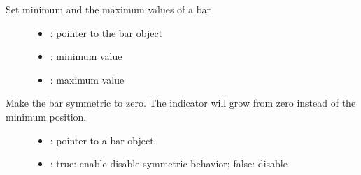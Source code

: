 \documentclass[letterpaper,10pt,english]{sphinxmanual}
\begin{document}
\begin{fulllineitems}
\label{\detokenize{object-types/bar:_CPPv416lv_bar_set_rangeP8lv_obj_t7int16_t7int16_t}}%
\pysigstartmultiline
{}\label{\detokenize{object-types/bar:lv__bar_8h_1aba7ab8511c3b9354a78ee89c8df0ff57}}%
\pysigstopmultiline
Set minimum and the maximum values of a bar \begin{description}
\item[{}] \leavevmode\begin{itemize}
\item {} 
: pointer to the bar object 

\item {} 
: minimum value 

\item {} 
: maximum value 

\end{itemize}

\end{description}


\end{fulllineitems}


\begin{fulllineitems}
\label{\detokenize{object-types/bar:_CPPv414lv_bar_set_symP8lv_obj_tb}}%
\pysigstartmultiline
{}\label{\detokenize{object-types/bar:lv__bar_8h_1a767d5492013ef8b68c42e16e10b87b2a}}%
\pysigstopmultiline
Make the bar symmetric to zero. The indicator will grow from zero instead of the minimum position. \begin{description}
\item[{}] \leavevmode\begin{itemize}
\item {} 
: pointer to a bar object 

\item {} 
: true: enable disable symmetric behavior; false: disable 

\end{itemize}

\end{description}


\end{fulllineitems}
\end{document}
